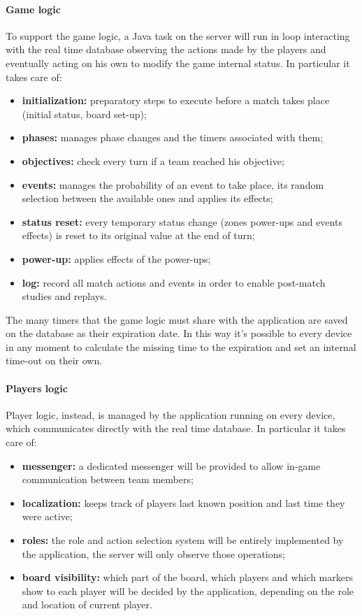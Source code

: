 			\paragraph{Game logic}
			
				To support the game logic, a Java task on the server will run in loop interacting with the real time database observing the actions made by the players and eventually acting on his own to modify the game internal status. In particular it takes care of:
				\begin{itemize}
					\item \textbf{initialization:} preparatory steps to execute before a match takes place (initial status, board set-up);
					\item \textbf{phases:} manages phase changes and the timers associated with them;
					\item \textbf{objectives:} check every turn if a team reached his objective;
					\item \textbf{events:} manages the probability of an event to take place, its random selection between the available ones and applies its effects;
					\item \textbf{status reset:} every temporary status change (zones power-ups and events effects) is reset to its original value at the end of turn;
					\item \textbf{power-up:} applies effects of the power-ups;
					\item \textbf{log:} record all match actions and events in order to enable post-match studies and replays.  
				\end{itemize}
				
				The many timers that the game logic must share with the application are saved on the database as their expiration date. In this way it's possible to every device in any moment to calculate the missing time to the expiration and set an internal time-out on their own.
			
			\paragraph{Players logic}
			
				Player logic, instead, is managed by the application running on every device, which communicates directly with the real time database. In particular it takes care of:
				\begin{itemize}
					\item \textbf{messenger:} a dedicated messenger will be provided to allow in-game communication between team members;
					\item \textbf{localization:} keeps track of players last known position and last time they were active;
					\item \textbf{roles:} the role and action selection system will be entirely implemented by the application, the server will only observe those operations;
					\item \textbf{board visibility:} which part of the board, which players and which markers show to each player will be decided by the application, depending on the role and location of current player.
				\end{itemize}
			
